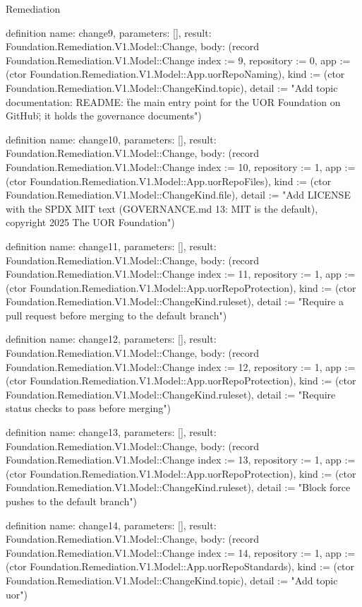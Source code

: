 \begin{lexlean}{Remediation}
\begin{semanticmodule}
definition{
  name: change9,
  parameters: [],
  result: Foundation.Remediation.V1.Model::Change,
  body: (record Foundation.Remediation.V1.Model::Change {index := 9, repository := 0, app := (ctor Foundation.Remediation.V1.Model::App.uorRepoNaming), kind := (ctor Foundation.Remediation.V1.Model::ChangeKind.topic), detail := "Add topic documentation: README: \"the main entry point for the UOR Foundation on GitHub\"; it holds the governance documents"})
}

definition{
  name: change10,
  parameters: [],
  result: Foundation.Remediation.V1.Model::Change,
  body: (record Foundation.Remediation.V1.Model::Change {index := 10, repository := 1, app := (ctor Foundation.Remediation.V1.Model::App.uorRepoFiles), kind := (ctor Foundation.Remediation.V1.Model::ChangeKind.file), detail := "Add LICENSE with the SPDX MIT text (GOVERNANCE.md 13: MIT is the default), copyright 2025 The UOR Foundation"})
}

definition{
  name: change11,
  parameters: [],
  result: Foundation.Remediation.V1.Model::Change,
  body: (record Foundation.Remediation.V1.Model::Change {index := 11, repository := 1, app := (ctor Foundation.Remediation.V1.Model::App.uorRepoProtection), kind := (ctor Foundation.Remediation.V1.Model::ChangeKind.ruleset), detail := "Require a pull request before merging to the default branch"})
}

definition{
  name: change12,
  parameters: [],
  result: Foundation.Remediation.V1.Model::Change,
  body: (record Foundation.Remediation.V1.Model::Change {index := 12, repository := 1, app := (ctor Foundation.Remediation.V1.Model::App.uorRepoProtection), kind := (ctor Foundation.Remediation.V1.Model::ChangeKind.ruleset), detail := "Require status checks to pass before merging"})
}

definition{
  name: change13,
  parameters: [],
  result: Foundation.Remediation.V1.Model::Change,
  body: (record Foundation.Remediation.V1.Model::Change {index := 13, repository := 1, app := (ctor Foundation.Remediation.V1.Model::App.uorRepoProtection), kind := (ctor Foundation.Remediation.V1.Model::ChangeKind.ruleset), detail := "Block force pushes to the default branch"})
}

definition{
  name: change14,
  parameters: [],
  result: Foundation.Remediation.V1.Model::Change,
  body: (record Foundation.Remediation.V1.Model::Change {index := 14, repository := 1, app := (ctor Foundation.Remediation.V1.Model::App.uorRepoStandards), kind := (ctor Foundation.Remediation.V1.Model::ChangeKind.topic), detail := "Add topic uor"})
}


\end{semanticmodule}
\end{lexlean}
